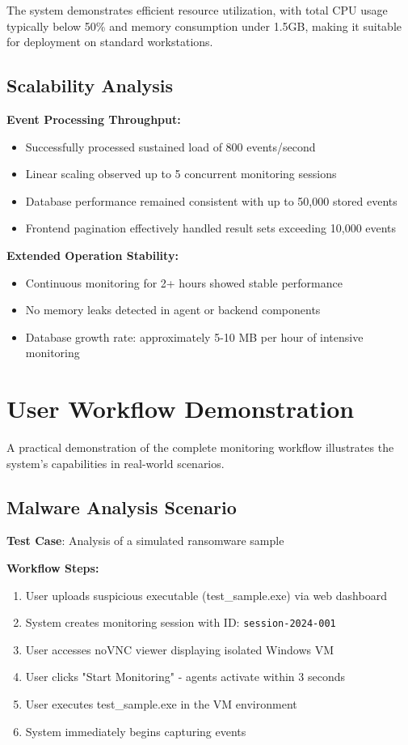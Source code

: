 The system demonstrates efficient resource utilization, with total CPU usage typically below 50\% and memory consumption under 1.5GB, making it suitable for deployment on standard workstations.

\subsection{Scalability Analysis}

\textbf{Event Processing Throughput:}
\begin{itemize}
    \item Successfully processed sustained load of 800 events/second
    \item Linear scaling observed up to 5 concurrent monitoring sessions
    \item Database performance remained consistent with up to 50,000 stored events
    \item Frontend pagination effectively handled result sets exceeding 10,000 events
\end{itemize}

\textbf{Extended Operation Stability:}
\begin{itemize}
    \item Continuous monitoring for 2+ hours showed stable performance
    \item No memory leaks detected in agent or backend components
    \item Database growth rate: approximately 5-10 MB per hour of intensive monitoring
\end{itemize}

\section{User Workflow Demonstration}

A practical demonstration of the complete monitoring workflow illustrates the system's capabilities in real-world scenarios.

\subsection{Malware Analysis Scenario}

\textbf{Test Case}: Analysis of a simulated ransomware sample

\textbf{Workflow Steps:}
\begin{enumerate}
    \item User uploads suspicious executable (test\_sample.exe) via web dashboard
    \item System creates monitoring session with ID: \texttt{session-2024-001}
    \item User accesses noVNC viewer displaying isolated Windows VM
    \item User clicks "Start Monitoring" - agents activate within 3 seconds
    \item User executes test\_sample.exe in the VM environment
    \item System immediately begins capturing events
\end{enumerate}

